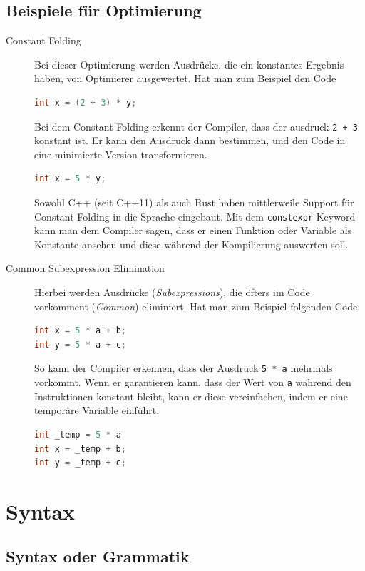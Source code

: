 \documentclass[
  ngerman,
  DIV=12
]{scrartcl}
\begin{document}
\subsection{Beispiele für Optimierung}

\begin{description}
\item[Constant Folding] Bei dieser Optimierung werden Ausdrücke, die ein konstantes Ergebnis haben, von Optimierer ausgewertet. Hat man zum Beispiel den Code
\begin{lstlisting}[language=C]
int x = (2 + 3) * y;
\end{lstlisting}
Bei dem Constant Folding erkennt der Compiler, dass der ausdruck \verb|2 + 3| konstant ist. Er kann den Ausdruck dann bestimmen, und den Code in eine minimierte Version transformieren.
\begin{lstlisting}[language=C]
int x = 5 * y;
\end{lstlisting}
\begin{anmerkung}
Sowohl C++ (seit C++11) als auch Rust haben mittlerweile Support für Constant Folding in die Sprache eingebaut. Mit dem \verb|constexpr| Keyword kann man dem Compiler sagen, dass er einen Funktion oder Variable als Konstante ansehen und diese während der Kompilierung auswerten soll.
\end{anmerkung}
\item[Common Subexpression Elimination] Hierbei werden Ausdrücke (\emph{Subexpressions}), die öfters im Code vorkomment (\emph{Common}) eliminiert. Hat man zum Beispiel folgenden Code:
\begin{lstlisting}[language=C]
int x = 5 * a + b;
int y = 5 * a + c;
\end{lstlisting}
So kann der Compiler erkennen, dass der Ausdruck \verb|5 * a| mehrmals vorkommt. Wenn er garantieren kann, dass der Wert von \verb|a| während den Instruktionen konstant bleibt, kann er diese vereinfachen, indem er eine temporäre Variable einführt.
\begin{lstlisting}[language=C]
int _temp = 5 * a
int x = _temp + b;
int y = _temp + c;
\end{lstlisting}
\end{description}


\section{Syntax}

\subsection{Syntax oder Grammatik}
\end{document}
